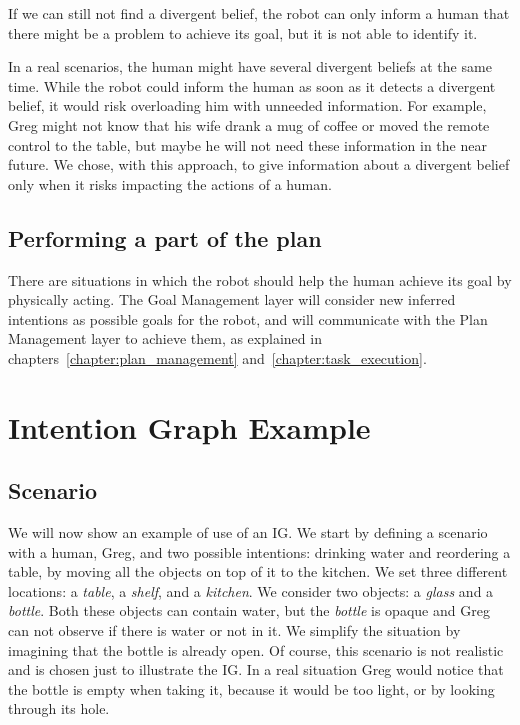 If we can still not find a divergent belief, the robot can only inform a human that there might be a problem to achieve its goal, but it is not able to identify it.


In a real scenarios, the human might have several divergent beliefs at the same time. While the robot could inform the human as soon as it detects a divergent belief, it would risk overloading him with unneeded information. For example, Greg might not know that his wife drank a mug of coffee or moved the remote control to the table, but maybe he will not need these information in the near future. We chose, with this approach, to give information about a divergent belief only when it risks impacting the actions of a human.

\subsection{Performing a part of the plan}
There are situations in which the robot should help the human achieve its goal by physically acting. The Goal Management layer will consider new inferred intentions as possible goals for the robot, and will communicate with the Plan Management layer to achieve them, as explained in chapters~\ref{chapter:plan_management} and~\ref{chapter:task_execution}. 

\section{Intention Graph Example}
\label{sec:intention-example}

\subsection{Scenario}
We will now show an example of use of an IG. We start by defining a scenario with a human, Greg, and two possible intentions: drinking water and reordering a table, by moving all the objects on top of it to the kitchen. We set three different locations: a \textit{table}, a \textit{shelf}, and a \textit{kitchen}. We consider two objects: a \textit{glass} and a \textit{bottle}. Both these objects can contain water, but the \textit{bottle} is opaque and Greg can not observe if there is water or not in it. We simplify the situation by imagining that the bottle is already open. Of course, this scenario is not realistic and is chosen just to illustrate the IG. In a real situation Greg would notice that the bottle is empty when taking it, because it would be too light, or by looking through its hole.


